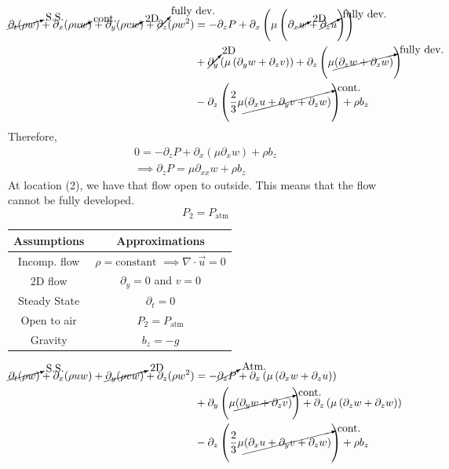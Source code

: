 \begin{align*}
    \cancelto{\text{S.S.}}{\partial_{t} (\rho w)} +\partial_{x} (\rho u  \cancelto{\text{cont.}} {w}) + \partial_{y} (\rho v \cancelto{\text{2D}}{w}) + \cancelto{\text{fully dev.}}{\partial_{z}} (\rho w^2) &= -\partial_{z} P + \partial_{x} \left(\mu \left(\partial_{x} \cancelto{\text{2D}}{w} + \cancelto{\text{fully dev.}}{\partial_{z} u}\right)\right) \\
    &+ \cancelto{\text{2D}}{\partial_{y}} \left(\mu \left(\partial_{y} w + \partial_{z} v\right)\right) + \partial_{z} \left(\mu \cancelto{\text{fully dev.}}{\left(\partial_{z} w + \partial_{z} w\right)}\right) \\
    &- \partial_{z} \left(\frac{2}{3}\mu \cancelto{\text{cont.}}{\left(\partial_{x} u + \partial_{y} v + \partial_{z} w\right)} \right)+ \rho b_z 
\end{align*}
Therefore,
\begin{gather*}
    0 = - \partial_{z} P + \partial_{x} \left(\mu \partial_x w\right) + \rho b_z \\
    \implies \partial_z P = \mu \partial_{xx} w + \rho b_z
\end{gather*}
At location (2), we have that flow open to outside. This means that the flow cannot be fully developed.
\begin{equation*}
    P_2 = P_{\text{atm}}
\end{equation*}
\begin{table}[h]
    \centering
    \begin{tabular}{c|c}
        Assumptions & Approximations \\
        \hline
        Incomp. flow & $\rho = \text{constant}$ $\implies \nabla \cdot \vec{u} = 0$ \\
        2D flow & $\partial_y = 0$  and $v = 0$ \\
        Steady State & $\partial_t = 0$ \\
        Open to air & $P_2 = P_{\text{atm}}$ \\
        Gravity & $b_z = -g$ \\
    \end{tabular}
\end{table}
\begin{align*}
    \cancelto{\text{S.S.}}{\partial_{t} (\rho w)} + \partial_{x} (\rho u w) + \cancelto{\text{2D}}{\partial_{y} (\rho v w)} + \partial_{z} (\rho w^2) &= -\cancelto{\text{Atm.}}{\partial_{z} P} + \partial_{x} \left(\mu \left(\partial_{x} w + \partial_{z} u\right)\right) \\
    &+ \partial_{y} \left(\mu \cancelto{\text{cont.}}{\left(\partial_{y} w + \partial_{z} v\right)} \right) + \partial_{z} \left(\mu \left(\partial_{z} w + \partial_{z} w\right)\right) \\
    &- \partial_{z} \left(\frac{2}{3}\mu \cancelto{\text{cont.}}{\left(\partial_{x} u + \partial_{y} v + \partial_{z} w\right)}\right)+ \rho b_z
\end{align*}
